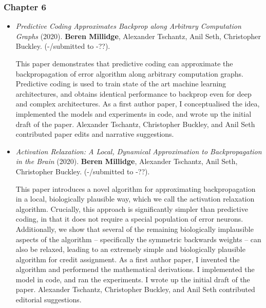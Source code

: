 \subsubsection{Chapter 6}

\begin{itemize}



\item \emph{Predictive Coding Approximates Backprop along Arbitrary Computation Graphs} (2020). \textbf{Beren Millidge}, Alexander Tschantz, Anil Seth, Christopher Buckley. (-/submitted to -??). 

This paper demonstrates that predictive coding can approximate the backpropagation of error algorithm along arbitrary computation graphs. Predictive coding is used to train state of the art machine learning architectures, and obtains identical performance to backprop even for deep and complex architectures. As a first author paper, I conceptualised the idea, implemented the models and experiments in code, and wrote up the initial draft of the paper. Alexander Tschantz, Christopher Buckley, and Anil Seth contributed paper edits and narrative suggestions.

\item \emph{Activation Relaxation: A Local, Dynamical Approximation to Backpropagation in the Brain} (2020). \textbf{Beren Millidge}, Alexander Tschantz, Anil Seth, Christopher Buckley. (-/submitted to -??).

This paper introduces a novel algorithm for approximating backpropagation in a local, biologically plausible way, which we call the activation relaxation algorithm. Crucially, this approach is significantly simpler than predictive coding, in that it does not require a special population of error neurons. Additionally, we show that several of the remaining biologically implausible aspects of the algorithm -- specifically the symmetric backwards weights -- can also be relaxed, leading to an extremely simple and biologically plausible algorithm for credit assignment. As a first author paper, I invented the algorithm and performend the mathematical derivations. I implemented the model in code, and ran the experiments. I wrote up the initial draft of the paper. Alexander Tschantz, Christopher Buckley, and Anil Seth contributed editorial suggestions.


\end{itemize}

